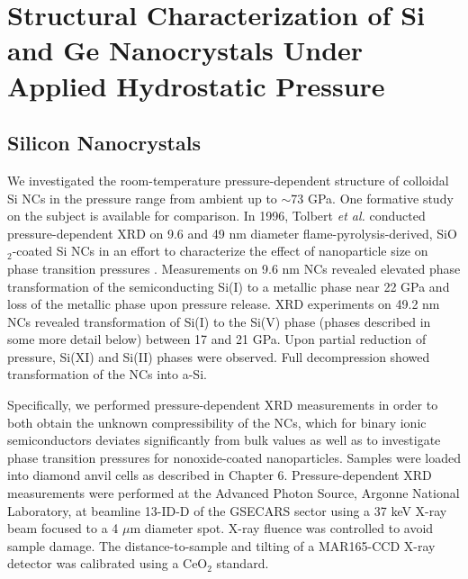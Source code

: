 \section{Structural Characterization of Si and Ge Nanocrystals Under Applied Hydrostatic Pressure}
\subsection{Silicon Nanocrystals}
We investigated the room-temperature pressure-dependent structure of colloidal Si NCs in the pressure range from ambient up to $\sim$73 GPa. One formative study on the subject is available for comparison. In 1996, Tolbert \emph{et al.} conducted pressure-dependent XRD on 9.6 and 49 nm diameter flame-pyrolysis-derived, SiO$_2$-coated Si NCs in an effort to characterize the effect of nanoparticle size on phase transition pressures \cite{PhysRevLett.76.4384}. Measurements on 9.6 nm NCs revealed elevated phase transformation of the semiconducting Si(I) to a metallic phase near 22 GPa and loss of the metallic phase upon pressure release. XRD experiments on 49.2 nm NCs revealed transformation of Si(I) to the Si(V) phase (phases described in some more detail below) between 17 and 21 GPa. Upon partial reduction of pressure, Si(XI) and Si(II) phases were observed. Full decompression showed transformation of the NCs into a-Si. \par

Specifically, we performed pressure-dependent XRD measurements in order to both obtain the unknown compressibility of the NCs, which for binary ionic semiconductors deviates significantly from bulk values \cite{PhysRevLett.101.217401} as well as to investigate phase transition pressures for nonoxide-coated nanoparticles. Samples were loaded into diamond anvil cells as described in Chapter 6. Pressure-dependent XRD measurements were performed at the Advanced Photon Source, Argonne National Laboratory, at beamline 13-ID-D of the GSECARS sector using a 37 keV X-ray beam focused to a 4 $\mu$m diameter spot. X-ray fluence was controlled to avoid sample damage. The distance-to-sample and tilting of a MAR165-CCD X-ray detector was calibrated using a CeO$_2$ standard. \par

